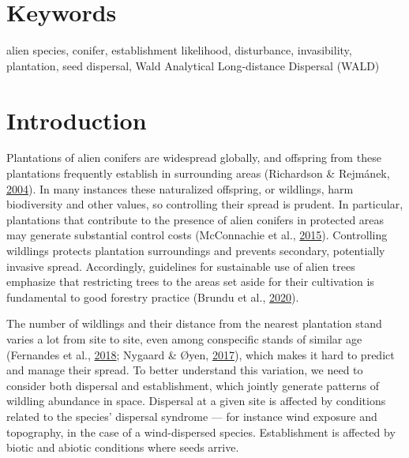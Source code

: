 \documentclass[
]{article}
\begin{document}
\hypertarget{keywords}{%
\section*{Keywords}\label{keywords}}

alien species, conifer, establishment likelihood, disturbance, invasibility, plantation, seed dispersal, Wald Analytical Long-distance Dispersal (WALD)

\newpage

\hypertarget{introduction}{%
\section{Introduction}\label{introduction}}

Plantations of alien conifers are widespread globally, and offspring from these plantations frequently establish in surrounding areas (Richardson \& Rejmánek, \protect\hyperlink{ref-richardsonConifersInvasiveAliens2004}{2004}).
In many instances these naturalized offspring, or wildlings, harm biodiversity and other values, so controlling their spread is prudent.
In particular, plantations that contribute to the presence of alien conifers in protected areas may generate substantial control costs (McConnachie et al., \protect\hyperlink{ref-mcconnachieEstimatingEffectPlantations2015}{2015}).
Controlling wildlings protects plantation surroundings and prevents secondary, potentially invasive spread.
Accordingly, guidelines for sustainable use of alien trees emphasize that restricting trees to the areas set aside for their cultivation is fundamental to good forestry practice (Brundu et al., \protect\hyperlink{ref-brunduGlobalGuidelinesSustainable2020}{2020}).

The number of wildlings and their distance from the nearest plantation stand varies a lot from site to site, even among conspecific stands of similar age (Fernandes et al., \protect\hyperlink{ref-fernandesWhatDrivesEucalyptus2018}{2018}; Nygaard \& Øyen, \protect\hyperlink{ref-nygaardSpreadIntroducedSitka2017}{2017}), which makes it hard to predict and manage their spread.
To better understand this variation, we need to consider both dispersal and establishment, which jointly generate patterns of wildling abundance in space.
Dispersal at a given site is affected by conditions related to the species' dispersal syndrome --- for instance wind exposure and topography, in the case of a wind-dispersed species.
Establishment is affected by biotic and abiotic conditions where seeds arrive.
\end{document}
